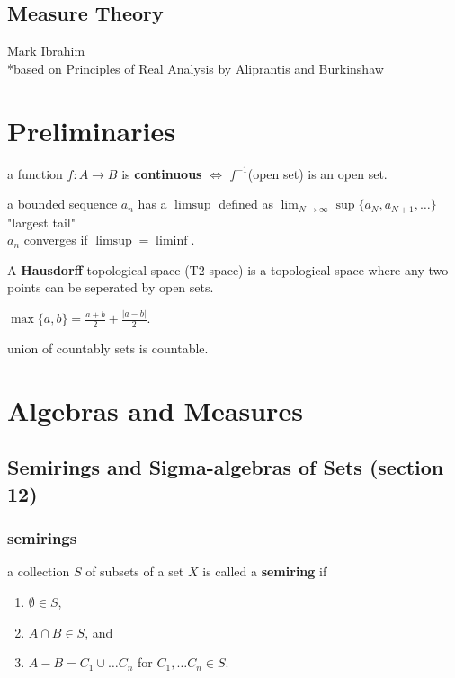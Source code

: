 \documentclass[a4paper, 12pt]{article}
\title{}
\date{}
\newcommand{\bt}[1]{\textbf{#1}} %
\begin{document}
\begin{center}
\section*{Measure Theory}
Mark Ibrahim \\
*based on Principles of Real Analysis by Aliprantis and Burkinshaw
\end{center}

\tableofcontents
\begin{multicols}{2}

\section{Preliminaries}

a function $f: A \rightarrow B$ is \bt{continuous}
$\iff$ $f^{-1}$(open set) is an open set.

a bounded sequence $a_n$ has a \bt{$\limsup$} defined as 
$\lim_{N \rightarrow \infty} \sup\{a_N, a_{N+1}, \dots \}$
"largest tail"\\
$a_n$ converges if $\limsup = \liminf$.


A \bt{Hausdorff} topological space (T2 space) is a topological space where 
any two points can be seperated by open sets.

$\max\{a, b\} = \frac{a + b}{2} + \frac{|a - b|}{2}$.

union of countably sets is countable.

\section{Algebras and Measures}
\subsection{Semirings and Sigma-algebras of Sets (section 12)}

\subsubsection{semirings}
a collection $S$ of subsets of a set $X$ is called a 
\bt{semiring} if  
\begin{enumerate}
    \item $\emptyset \in S$, 
    \item $A \cap B \in S$, and 
    \item $A - B = C_1 \cup \dots C_n$ for $C_1, \dots C_n \in S$.
\end{enumerate}


\end{multicols}
\end{document}
